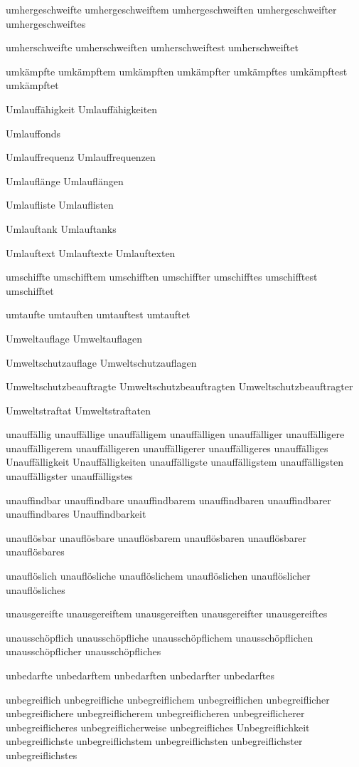 umhergeschweifte
umhergeschweiftem
umhergeschweiften
umhergeschweifter
umhergeschweiftes

umherschweifte
umherschweiften
umherschweiftest
umherschweiftet

umkämpfte
umkämpftem
umkämpften
umkämpfter
umkämpftes
umkämpftest
umkämpftet

Umlauffähigkeit
Umlauffähigkeiten

Umlauffonds

Umlauffrequenz
Umlauffrequenzen

Umlauflänge
Umlauflängen

Umlaufliste
Umlauflisten

Umlauftank
Umlauftanks

Umlauftext
Umlauftexte
Umlauftexten

umschiffte
umschifftem
umschifften
umschiffter
umschifftes
umschifftest
umschifftet

umtaufte
umtauften
umtauftest
umtauftet

Umweltauflage
Umweltauflagen

Umweltschutzauflage
Umweltschutzauflagen

Umweltschutzbeauftragte
Umweltschutzbeauftragten
Umweltschutzbeauftragter

Umweltstraftat
Umweltstraftaten

unauffällig
unauffällige
unauffälligem
unauffälligen
unauffälliger
unauffälligere
unauffälligerem
unauffälligeren
unauffälligerer
unauffälligeres
unauffälliges
Unauffälligkeit
Unauffälligkeiten
unauffälligste
unauffälligstem
unauffälligsten
unauffälligster
unauffälligstes

unauffindbar
unauffindbare
unauffindbarem
unauffindbaren
unauffindbarer
unauffindbares
Unauffindbarkeit

unauflösbar
unauflösbare
unauflösbarem
unauflösbaren
unauflösbarer
unauflösbares

unauflöslich
unauflösliche
unauflöslichem
unauflöslichen
unauflöslicher
unauflösliches

unausgereifte
unausgereiftem
unausgereiften
unausgereifter
unausgereiftes

unausschöpflich
unausschöpfliche
unausschöpflichem
unausschöpflichen
unausschöpflicher
unausschöpfliches

unbedarfte
unbedarftem
unbedarften
unbedarfter
unbedarftes

unbegreiflich
unbegreifliche
unbegreiflichem
unbegreiflichen
unbegreiflicher
unbegreiflichere
unbegreiflicherem
unbegreiflicheren
unbegreiflicherer
unbegreiflicheres
unbegreiflicherweise
unbegreifliches
Unbegreiflichkeit
unbegreiflichste
unbegreiflichstem
unbegreiflichsten
unbegreiflichster
unbegreiflichstes

